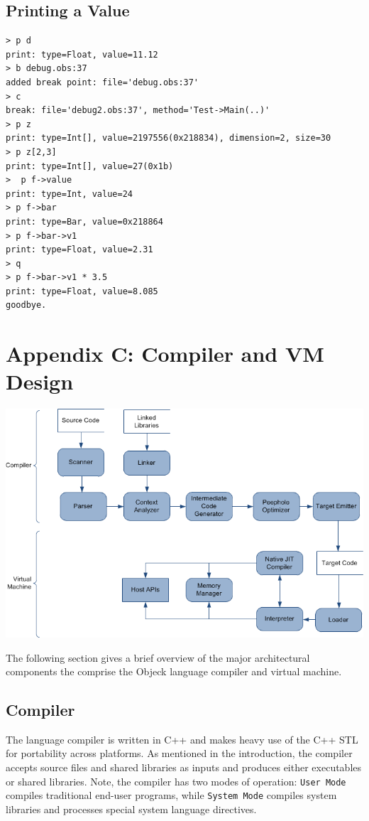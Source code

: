 \documentclass[12pt]{article}
\begin{document}
\subsection{Printing a Value}
\begin{verbatim}
> p d
print: type=Float, value=11.12
> b debug.obs:37
added break point: file='debug.obs:37'
> c
break: file='debug2.obs:37', method='Test->Main(..)'
> p z
print: type=Int[], value=2197556(0x218834), dimension=2, size=30
> p z[2,3]
print: type=Int[], value=27(0x1b)
>  p f->value
print: type=Int, value=24
> p f->bar
print: type=Bar, value=0x218864
> p f->bar->v1
print: type=Float, value=2.31
> q
> p f->bar->v1 * 3.5
print: type=Float, value=8.085
goodbye.
\end{verbatim}

\section{Appendix C: Compiler and VM Design}
\includegraphics[scale=0.60]{../../images/compiler_data_flow.png}

The following section gives a brief overview of the major architectural components the comprise the Objeck language compiler and virtual machine.

\subsection{Compiler}
The language compiler is written in C++ and makes heavy use of the C++ STL for portability across platforms.  As mentioned in the introduction, the compiler accepts source files and shared libraries as inputs and produces either executables or shared libraries.  Note, the compiler has two modes of operation: \texttt{User Mode} compiles traditional end-user programs, while \texttt{System Mode} compiles system libraries and processes special system language directives.
\end{document}
